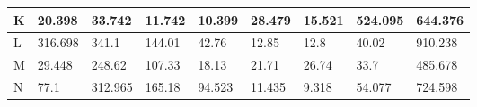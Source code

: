 \begin{landscape}
\begin{longtable}[c]{|l|llllllll|}
    K                                                                               & \multicolumn{1}{l|}{20.398}                                                         & \multicolumn{1}{l|}{33.742}                                                         & \multicolumn{1}{l|}{11.742}                                                         & \multicolumn{1}{l|}{10.399}                                                         & \multicolumn{1}{l|}{28.479}                                    & \multicolumn{1}{l|}{15.521}                                    & \multicolumn{1}{l|}{524.095}                                       & 644.376                                                                                \\ \hline
    L                                                                               & \multicolumn{1}{l|}{316.698}                                                        & \multicolumn{1}{l|}{341.1}                                                          & \multicolumn{1}{l|}{144.01}                                                         & \multicolumn{1}{l|}{42.76}                                                          & \multicolumn{1}{l|}{12.85}                                     & \multicolumn{1}{l|}{12.8}                                      & \multicolumn{1}{l|}{40.02}                                         & 910.238                                                                                \\ \hline
    M                                                                               & \multicolumn{1}{l|}{29.448}                                                         & \multicolumn{1}{l|}{248.62}                                                         & \multicolumn{1}{l|}{107.33}                                                         & \multicolumn{1}{l|}{18.13}                                                          & \multicolumn{1}{l|}{21.71}                                     & \multicolumn{1}{l|}{26.74}                                     & \multicolumn{1}{l|}{33.7}                                          & 485.678                                                                                \\ \hline
    N                                                                               & \multicolumn{1}{l|}{77.1}                                                           & \multicolumn{1}{l|}{312.965}                                                        & \multicolumn{1}{l|}{165.18}                                                         & \multicolumn{1}{l|}{94.523}                                                         & \multicolumn{1}{l|}{11.435}                                    & \multicolumn{1}{l|}{9.318}                                     & \multicolumn{1}{l|}{54.077}                                        & 724.598                                                                                \\ \hline

\end{longtable}
\end{landscape}
